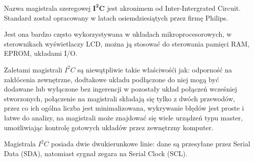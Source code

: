 Nazwa magistrala szeregowej $\mathbf{I^{2}C}$ jest akronimem od Inter-Intergrated Circuit. Standard został opracowany w latach osiemdziesiątych przez firmę Philips.

Jest ona bardzo często wykorzystywana w układach mikroprocesorowych, w sterownikach wyświetlaczy LCD, można ją stosować do sterowania pamięci RAM, EPROM, układami I/O.

Zaletami magistrali $I^{2}C$ są niewątpliwie takie właściwośći jak: odporność na zakłócenia zewnętrzne, dodtakowe układu podłączone do niej mogą być dodawane lub wyłączone bez ingerencji w pozostały układ połączeń wcześniej stworzonych, połączenie na magistrali składają się tylko z dwóch przewodów, przez co ich ogólna liczba jest minimalizowana, wykrywanie błędów jest proste i łatwe do analizy, na magistrali może znajdować się wiele urządzeń typu master, umożliwiając kontrolę gotowych układów przez zewnętrzny komputer.

Magistrala $I^{2}C$ posiada dwie dwukierunkowe linie: dane są przesyłane przez Serial Data (SDA), natomiast sygnał zegara na Serial Clock (SCL).
